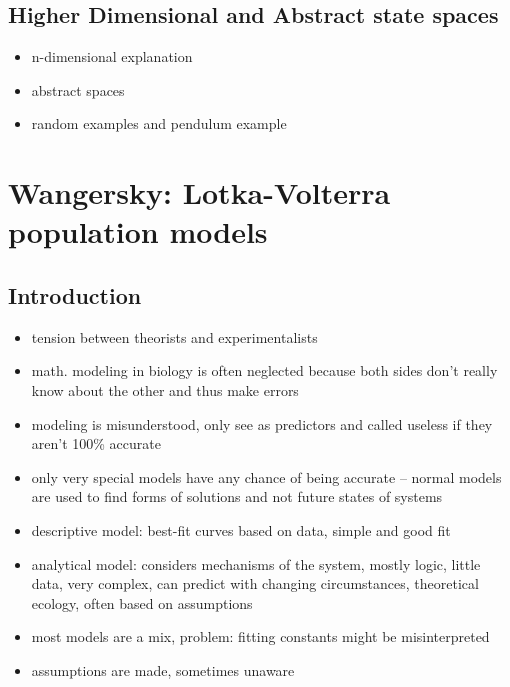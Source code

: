 \documentclass[a4paper,reqno,11pt]{article}
\begin{document}
\subsection{Higher Dimensional and Abstract state spaces}

\begin{itemize}
    \item n-dimensional explanation
    \item abstract spaces
    \item random examples and pendulum example
\end{itemize}


\section{Wangersky: Lotka-Volterra population models}

\subsection {Introduction}

\begin{itemize}
    \item tension between theorists and experimentalists
    \item math. modeling in biology is often neglected because both sides don't
        really know about the other and thus make errors
    \item modeling is misunderstood, only see as predictors and called useless
        if they aren't 100\% accurate
    \item only very special models have any chance of being accurate -- normal
        models are used to find forms of solutions and not future states of
        systems
    \item descriptive model: best-fit curves based on data, simple and good
        fit
    \item analytical model: considers mechanisms of the system, mostly logic,
        little data, very complex, can predict with changing circumstances,
        theoretical ecology, often based on assumptions
    \item most models are a mix, problem: fitting constants might be
        misinterpreted
    \item assumptions are made, sometimes unaware
\end{itemize}
\end{document}
